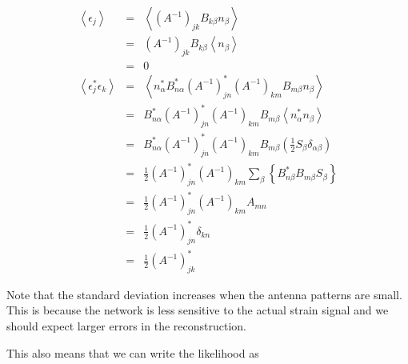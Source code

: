 \documentclass[10pt]{article}
\begin{document}
\begin{eqnarray}
\left<\epsilon_j\right> & = & \left< \left(A^{-1}\right)_{jk}B_{k\beta}n_\beta \right> \\
                        & = & \left(A^{-1}\right)_{jk}B_{k\beta} \left< n_\beta \right> \\
                        & = & 0 \\
\left<\epsilon_j^\ast \epsilon_k\right> & = & \left< n_\alpha^\ast B_{n\alpha}^\ast \left(A^{-1}\right)_{jn}^\ast \left(A^{-1}\right)_{km}B_{m\beta}n_\beta \right> \\
                                        & = & B_{n\alpha}^\ast \left(A^{-1}\right)_{jn}^\ast \left(A^{-1}\right)_{km}B_{m\beta} \left< n_\alpha^\ast n_\beta \right> \\
                                        & = & B_{n\alpha}^\ast \left(A^{-1}\right)_{jn}^\ast \left(A^{-1}\right)_{km}B_{m\beta} \left(\frac{1}{2}S_\beta\delta_{\alpha\beta} \right) \\
                                        & = & \frac{1}{2} \left(A^{-1}\right)_{jn}^\ast \left(A^{-1}\right)_{km}  \sum_\beta \left\{B_{n\beta}^\ast B_{m\beta} S_\beta\right\} \\
                                        & = & \frac{1}{2} \left(A^{-1}\right)_{jn}^\ast \left(A^{-1}\right)_{km}  A_{mn} \\
                                        & = & \frac{1}{2} \left(A^{-1}\right)_{jn}^\ast \delta_{kn} \\
                                        & = & \frac{1}{2} \left(A^{-1}\right)_{jk}^\ast
\end{eqnarray}

Note that the standard deviation increases when the antenna patterns are small. This is because the network is less sensitive to the actual strain signal and we should expect larger errors in the reconstruction.

This also means that we can write the likelihood as 
\end{document}
